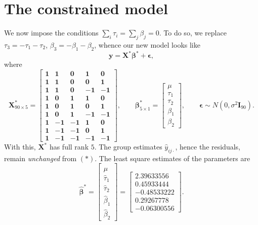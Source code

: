 \documentclass[10pt]{article}
\renewcommand{\vec}{\bm}
\begin{document}
    \section{The constrained model}

    We now impose the conditions $\sum_i \tau_i = \sum_j \beta_j = 0$. To do so, we
    replace $\tau_3 = -\tau_1 - \tau_2$, $\beta_3 = -\beta_1 - \beta_2$, whence our
    new model looks like \[
        \vec{y} = \vec{X}^*\vec{\beta}^* + \vec{\epsilon},
    \] where \[
        \vec{X}_{90\times 5}^* = \begin{bmatrix}
            \vec{1} & \vec{1}  & \vec{0}  & \vec{1}  & \vec{0} \\
            \vec{1} & \vec{1}  & \vec{0}  & \vec{0}  & \vec{1} \\
            \vec{1} & \vec{1}  & \vec{0}  & \vec{-1} & \vec{-1} \\
            \vec{1} & \vec{0}  & \vec{1}  & \vec{1}  & \vec{0} \\
            \vec{1} & \vec{0}  & \vec{1}  & \vec{0}  & \vec{1} \\
            \vec{1} & \vec{0}  & \vec{1}  & \vec{-1} & \vec{-1} \\
            \vec{1} & \vec{-1} & \vec{-1} & \vec{1}  & \vec{0} \\
            \vec{1} & \vec{-1} & \vec{-1} & \vec{0}  & \vec{1} \\
            \vec{1} & \vec{-1} & \vec{-1} & \vec{-1} & \vec{-1}
        \end{bmatrix}, \qquad
        \vec{\beta}_{5\times 1}^* = \begin{bmatrix}
            \mu \\ \tau_1 \\ \tau_2 \\ \beta_1 \\ \beta_2
        \end{bmatrix}, \qquad
        \vec{\epsilon} \sim N(0, \sigma^2 \vec{I}_{90}).
    \] With this, $\vec{X}^*$ has full rank $5$. The group estimates
    $\hat{y}_{ij\cdot}$, hence the residuals, remain \emph{unchanged} from $(*)$. The
    least square estimates of the parameters are \[
        \hat{\vec{\beta}}^* = \begin{bmatrix}
            \hat{\mu} \\ \hat{\tau}_1 \\ \hat{\tau}_2 \\ \hat{\beta}_1 \\
            \hat{\beta}_2
        \end{bmatrix} = \begin{bmatrix}
            2.39633556 \\
            0.45933444 \\
            -0.48533222 \\
            0.29267778 \\
            -0.06300556
        \end{bmatrix}.
    \]
\end{document}
